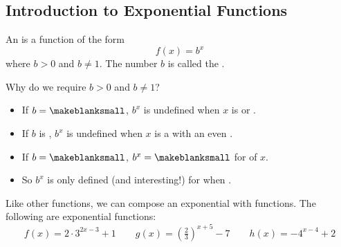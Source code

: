 \subsection{Introduction to Exponential Functions} 
\begin{definition}
An  is a function of the form
\[
f(x)=b^x
\]
where $b>0$ and $b\neq 1$. The number $b$ is called the .
\end{definition}
Why do we require $b>0$ and $b\neq 1$?
\begin{itemize}
\item If $b=\makeblanksmall$, $b^x$ is undefined when $x$ is \makeblank[1in] or \makeblanksmall.
\item If $b$ is \makeblank[1in], $b^x$ is undefined when $x$ is a \makeblank[1in] with an even \makeblank[1.5in].
\item If $b=\makeblanksmall$, $b^x=\makeblanksmall$ for \makeblank[1.5in] of $x$.
\item So $b^x$ is only defined (and interesting!) for \makeblank when \makeblank.
\end{itemize}
Like other functions, we can compose an exponential with \makeblank[1in] functions. The following are exponential functions:
\[
f(x)=2\cdot 3^{2x-3}+1
\qquad
g(x)=\left(\tfrac{2}{3}\right)^{x+5}-7
\qquad
h(x)=-4^{x-4}+2
\]